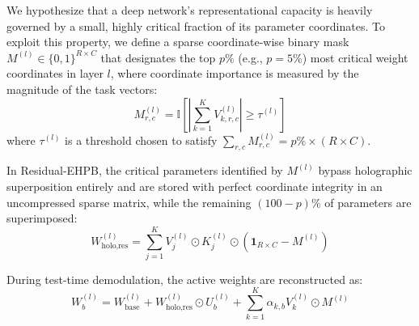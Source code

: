 We hypothesize that a deep network's representational capacity is heavily governed by a small, highly critical fraction of its parameter coordinates. To exploit this property, we define a sparse coordinate-wise binary mask $M^{(l)} \in \{0, 1\}^{R \times C}$ that designates the top $p\%$ (e.g., $p = 5\%$) most critical weight coordinates in layer $l$, where coordinate importance is measured by the magnitude of the task vectors:
\begin{equation}
M_{r, c}^{(l)} = \mathbb{I}\left[ \left| \sum_{k=1}^K V_{k, r, c}^{(l)} \right| \geq \tau^{(l)} \right]
\end{equation}
where $\tau^{(l)}$ is a threshold chosen to satisfy $\sum_{r, c} M_{r, c}^{(l)} = p\% \times (R \times C)$. 

In Residual-EHPB, the critical parameters identified by $M^{(l)}$ bypass holographic superposition entirely and are stored with perfect coordinate integrity in an uncompressed sparse matrix, while the remaining $(100 - p)\%$ of parameters are superimposed:
\begin{equation}
W_{\text{holo}, \text{res}}^{(l)} = \sum_{j=1}^K V_j^{(l)} \odot K_j^{(l)} \odot \left( \mathbf{1}_{R \times C} - M^{(l)} \right)
\end{equation}

During test-time demodulation, the active weights are reconstructed as:
\begin{equation}
W_b^{(l)} = W_{\text{base}}^{(l)} + W_{\text{holo}, \text{res}}^{(l)} \odot U_b^{(l)} + \sum_{k=1}^K \alpha_{k, b} V_k^{(l)} \odot M^{(l)}
\end{equation}

